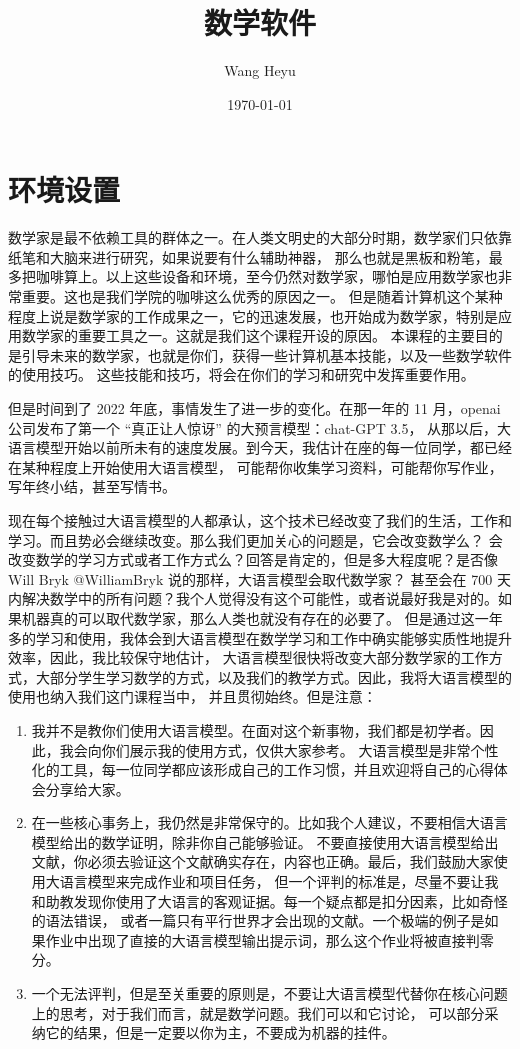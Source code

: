\documentclass{ctexbook}
\title{数学软件}
\author{Wang Heyu}
\date{\today}
\numberwithin{theorem}{chapter}
\begin{document}
  
\maketitle  

\chapter{环境设置}

数学家是最不依赖工具的群体之一。在人类文明史的大部分时期，数学家们只依靠纸笔和大脑来进行研究，如果说要有什么辅助神器，
那么也就是黑板和粉笔，最多把咖啡算上。以上这些设备和环境，至今仍然对数学家，哪怕是应用数学家也非常重要。这也是我们学院的咖啡这么优秀的原因之一。
但是随着计算机这个某种程度上说是数学家的工作成果之一，它的迅速发展，也开始成为数学家，特别是应用数学家的重要工具之一。这就是我们这个课程开设的原因。
本课程的主要目的是引导未来的数学家，也就是你们，获得一些计算机基本技能，以及一些数学软件的使用技巧。
这些技能和技巧，将会在你们的学习和研究中发挥重要作用。

但是时间到了 2022 年底，事情发生了进一步的变化。在那一年的 11 月，openai 公司发布了第一个 ``真正让人惊讶'' 的大预言模型：chat-GPT 3.5，
从那以后，大语言模型开始以前所未有的速度发展。到今天，我估计在座的每一位同学，都已经在某种程度上开始使用大语言模型，
可能帮你收集学习资料，可能帮你写作业，写年终小结，甚至写情书。

现在每个接触过大语言模型的人都承认，这个技术已经改变了我们的生活，工作和学习。而且势必会继续改变。那么我们更加关心的问题是，它会改变数学么？
会改变数学的学习方式或者工作方式么？回答是肯定的，但是多大程度呢？是否像 Will Bryk @WilliamBryk 说的那样，大语言模型会取代数学家？
甚至会在 700 天内解决数学中的所有问题？我个人觉得没有这个可能性，或者说最好我是对的。如果机器真的可以取代数学家，那么人类也就没有存在的必要了。
但是通过这一年多的学习和使用，我体会到大语言模型在数学学习和工作中确实能够实质性地提升效率，因此，我比较保守地估计，
大语言模型很快将改变大部分数学家的工作方式，大部分学生学习数学的方式，以及我们的教学方式。因此，我将大语言模型的使用也纳入我们这门课程当中，
并且贯彻始终。但是注意：
\begin{enumerate}
  \item 我并不是教你们使用大语言模型。在面对这个新事物，我们都是初学者。因此，我会向你们展示我的使用方式，仅供大家参考。
  大语言模型是非常个性化的工具，每一位同学都应该形成自己的工作习惯，并且欢迎将自己的心得体会分享给大家。
  \item 在一些核心事务上，我仍然是非常保守的。比如我个人建议，不要相信大语言模型给出的数学证明，除非你自己能够验证。
  不要直接使用大语言模型给出文献，你必须去验证这个文献确实存在，内容也正确。最后，我们鼓励大家使用大语言模型来完成作业和项目任务，
  但一个评判的标准是，尽量不要让我和助教发现你使用了大语言的客观证据。每一个疑点都是扣分因素，比如奇怪的语法错误，
  或者一篇只有平行世界才会出现的文献。一个极端的例子是如果作业中出现了直接的大语言模型输出提示词，那么这个作业将被直接判零分。
  \item 一个无法评判，但是至关重要的原则是，不要让大语言模型代替你在核心问题上的思考，对于我们而言，就是数学问题。我们可以和它讨论，
  可以部分采纳它的结果，但是一定要以你为主，不要成为机器的挂件。
\end{enumerate}
\end{document}

